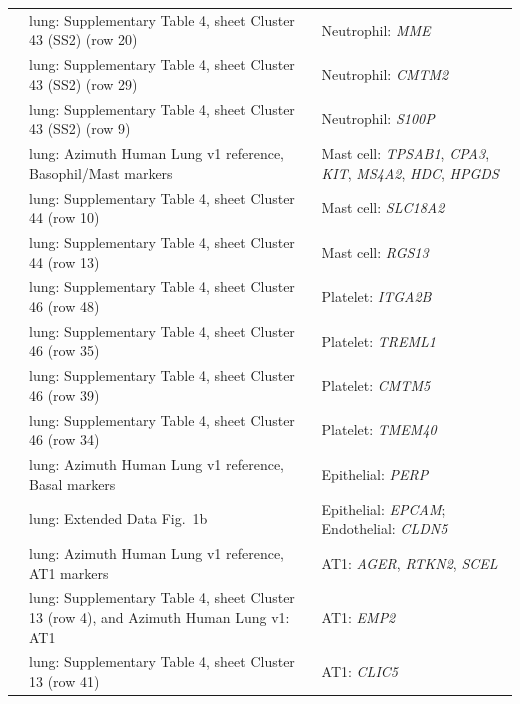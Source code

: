 \begin{longtable}{@{}>{\raggedright\arraybackslash}p{2.0cm} >{\raggedright\arraybackslash}p{4.6cm} >{\raggedright\arraybackslash}p{8.4cm}@{}}
\cite{travagliniMolecularCellAtlas2020} & lung: Supplementary Table 4, sheet Cluster 43 (SS2) (row 20) & Neutrophil: \textit{MME} \\
\cite{travagliniMolecularCellAtlas2020} & lung: Supplementary Table 4, sheet Cluster 43 (SS2) (row 29) & Neutrophil: \textit{CMTM2} \\
\cite{travagliniMolecularCellAtlas2020} & lung: Supplementary Table 4, sheet Cluster 43 (SS2) (row 9) & Neutrophil: \textit{S100P} \\
\cite{travagliniMolecularCellAtlas2020} & lung: Azimuth Human Lung v1 reference, Basophil/Mast markers & Mast cell: \textit{TPSAB1}, \textit{CPA3}, \textit{KIT}, \textit{MS4A2}, \textit{HDC}, \textit{HPGDS} \\
\cite{travagliniMolecularCellAtlas2020} & lung: Supplementary Table 4, sheet Cluster 44 (row 10) & Mast cell: \textit{SLC18A2} \\
\cite{travagliniMolecularCellAtlas2020} & lung: Supplementary Table 4, sheet Cluster 44 (row 13) & Mast cell: \textit{RGS13} \\
\cite{travagliniMolecularCellAtlas2020} & lung: Supplementary Table 4, sheet Cluster 46 (row 48) & Platelet: \textit{ITGA2B} \\
\cite{travagliniMolecularCellAtlas2020} & lung: Supplementary Table 4, sheet Cluster 46 (row 35) & Platelet: \textit{TREML1} \\
\cite{travagliniMolecularCellAtlas2020} & lung: Supplementary Table 4, sheet Cluster 46 (row 39) & Platelet: \textit{CMTM5} \\
\cite{travagliniMolecularCellAtlas2020} & lung: Supplementary Table 4, sheet Cluster 46 (row 34) & Platelet: \textit{TMEM40} \\
\cite{travagliniMolecularCellAtlas2020} & lung: Azimuth Human Lung v1 reference, Basal markers & Epithelial: \textit{PERP} \\
\cite{travagliniMolecularCellAtlas2020} & lung: Extended Data Fig.~1b & Epithelial: \textit{EPCAM}; Endothelial: \textit{CLDN5} \\
\cite{travagliniMolecularCellAtlas2020} & lung: Azimuth Human Lung v1 reference, AT1 markers & AT1: \textit{AGER}, \textit{RTKN2}, \textit{SCEL} \\
\cite{travagliniMolecularCellAtlas2020} & lung: Supplementary Table 4, sheet Cluster 13 (row 4), and Azimuth Human Lung v1: AT1 & AT1: \textit{EMP2} \\
\cite{travagliniMolecularCellAtlas2020} & lung: Supplementary Table 4, sheet Cluster 13 (row 41) & AT1: \textit{CLIC5} \\

\end{longtable}

